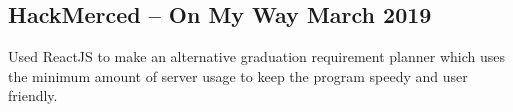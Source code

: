 \documentclass[../Resume.tex]{subfiles}
\begin{document}
	\subsection{HackMerced -- On My Way \null\hfill March 2019}
	\par Used ReactJS to make an alternative graduation requirement planner which uses the minimum amount of server usage to keep the program speedy and user friendly.
	\vspace*{-2mm}
\end{document}
